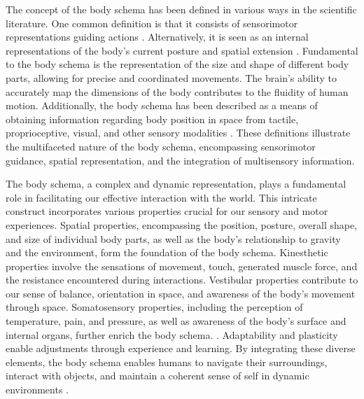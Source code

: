 The concept of the body schema has been defined in various ways in the scientific literature. One common definition is that it consists of sensorimotor representations guiding actions \cite{Maravita2003MultisensoryIntegrationBody}. Alternatively, it is seen as an internal representations of the body's current posture and spatial extension \cite{Vignemont2010Bodyschemabody}. Fundamental to the body schema is the representation of the size and shape of different body parts, allowing for precise and coordinated movements. The brain's ability to accurately map the dimensions of the body contributes to the fluidity of human motion. Additionally, the body schema has been described as a means of obtaining information regarding body position in space from tactile, proprioceptive, visual, and other sensory modalities \cite{Medina2010mapsformspace}. These definitions illustrate the multifaceted nature of the body schema, encompassing sensorimotor guidance, spatial representation, and the integration of multisensory information.

The body schema, a complex and dynamic representation, plays a fundamental role in facilitating our effective interaction with the world. This intricate construct incorporates various properties crucial for our sensory and motor experiences. Spatial properties, encompassing the position, posture, overall shape, and size of individual body parts, as well as the body's relationship to gravity and the environment, form the foundation of the body schema. Kinesthetic properties involve the sensations of movement, touch, generated muscle force, and the resistance encountered during interactions. Vestibular properties contribute to our sense of balance, orientation in space, and awareness of the body's movement through space. Somatosensory properties, including the perception of temperature, pain, and pressure, as well as awareness of the body's surface and internal organs, further enrich the body schema. . Adaptability and plasticity enable adjustments through experience and learning. By integrating these diverse elements, the body schema enables humans to navigate their surroundings, interact with objects, and maintain a coherent sense of self in dynamic environments \cite{Vignemont20213C1Whatisbody,Morasso2015Revisitingbodyschema,Asada2018168Proprioceptionbodyschema}.


